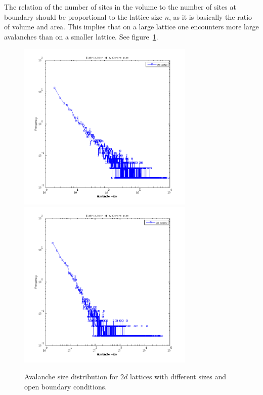 The relation of the number of sites in the volume to the number of sites at boundary should be proportional to the lattice size $n$, as it is basically the ratio of volume and area. This implies that on a large lattice one encounters more large avalanches than on a smaller lattice. See figure~\ref{sn}.

\begin{figure}
\begin{center}
\includegraphics[width=0.75\textwidth]{results/2sn50.png}
\includegraphics[width=0.75\textwidth]{results/2sn100.png}
\caption{Avalanche size distribution for $2d$ lattices with different sizes and open boundary conditions.}
\label{sn}
\end{center}
\end{figure} 

